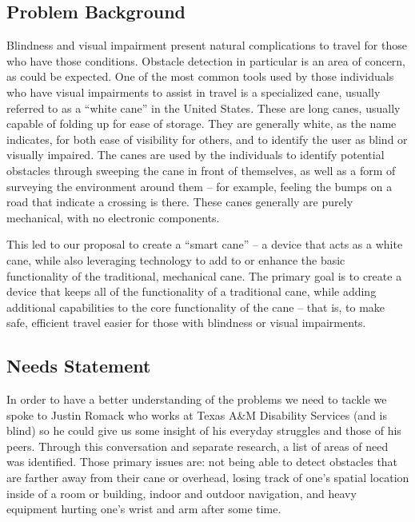 \documentclass[letterpaper,12pt]{article}
\begin{document}
\subsection{Problem Background}

Blindness and visual impairment present natural complications to travel for those who have those conditions. Obstacle detection in particular is an area of concern, as could be expected. One of the most common tools used by those individuals who have visual impairments to assist in travel is a specialized cane, usually referred to as a “white cane” in the United States. These are long canes, usually capable of folding up for ease of storage. They are generally white, as the name indicates, for both ease of visibility for others, and to identify the user as blind or visually impaired. The canes are used by the individuals to identify potential obstacles through sweeping the cane in front of themselves, as well as a form of surveying the environment around them – for example, feeling the bumps on a road that indicate a crossing is there. These canes generally are purely mechanical, with no electronic components. \par

This led to our proposal to create a “smart cane” – a device that acts as a white cane, while also leveraging technology to add to or enhance the basic functionality of the traditional, mechanical cane. The primary goal is to create a device that keeps all of the functionality of a traditional cane, while adding additional capabilities to the core functionality of the cane – that is, to make safe, efficient travel easier for those with blindness or visual impairments. \par

\subsection{Needs Statement}
In order to have a better understanding of the problems we need to tackle we spoke to Justin Romack who works at Texas A\&M Disability Services (and is blind) so he could give us some insight of his everyday struggles and those of his peers. Through this conversation and separate research, a list of areas of need was identified. Those primary issues are: not being able to detect obstacles that are farther away from their cane or overhead, losing track of one’s spatial location inside of a room or building, indoor and outdoor navigation, and heavy equipment hurting one’s wrist and arm after some time.
\end{document}
